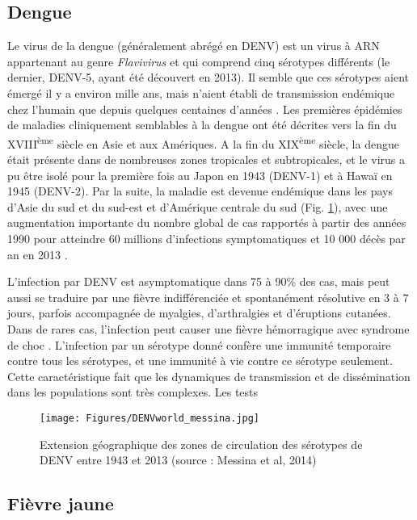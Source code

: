 \subsection{Dengue}

Le virus de la dengue (généralement abrégé en DENV) est un virus à ARN appartenant au genre {\em Flavivirus} et qui comprend cinq sérotypes différents (le dernier, DENV-5, ayant été découvert en 2013).
Il semble que ces sérotypes aient émergé il y a environ mille ans, mais n'aient établi de transmission endémique chez l'humain que depuis quelques centaines d'années \cite{holmes2003origin}.
Les premières épidémies de maladies cliniquement semblables à la dengue ont été décrites vers la fin du XVIII\textsuperscript{ème} siècle en Asie et aux Amériques.
A la fin du XIX\textsuperscript{ème} siècle, la dengue était présente dans de nombreuses zones tropicales et subtropicales, et le virus a pu être isolé pour la première fois au Japon en 1943 (DENV-1) et à Hawaï en 1945 (DENV-2).
Par la suite, la maladie est devenue endémique dans les pays d'Asie du sud et du sud-est et d'Amérique centrale du sud (Fig. \ref{fig:denvworld}), avec une augmentation importante du nombre global de cas rapportés à partir des années 1990 pour atteindre 60 millions d'infections symptomatiques et 10 000 décès par an en 2013 \cite{messina2014global,stanaway2016global}.

L'infection par DENV est asymptomatique dans 75 à 90\% des cas, mais peut aussi se traduire par une fièvre indifférenciée et spontanément résolutive en 3 à 7 jours, parfois accompagnée de myalgies, d'arthralgies et d'éruptions cutanées.
Dans de rares cas, l'infection peut causer une fièvre hémorragique avec syndrome de choc \cite{simmons2012dengue}.
L'infection par un sérotype donné confère une immunité temporaire contre tous les sérotypes, et une immunité à vie contre ce sérotype seulement.
Cette caractéristique fait que les dynamiques de transmission et de dissémination dans les populations sont très complexes.
Les tests 

\begin{figure}[t]
	\centering
	\texttt{[image: Figures/DENVworld\_messina.jpg]}
	\caption{Extension géographique des zones de circulation des sérotypes de DENV entre 1943 et 2013 (source : Messina et al, 2014)}
	\label{fig:denvworld}
\end{figure}



\subsection{Fièvre jaune}

